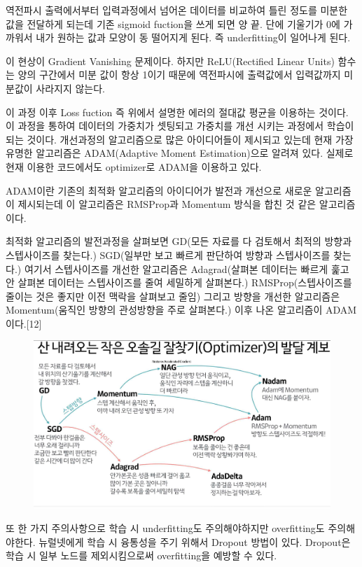 \documentclass[chapter,oneside]{oblivoir}
\begin{document}
역전파시 출력에서부터 입력과정에서 넘어온 데이터를 비교하여 틀린 정도를 미분한 값을 전달하게 되는데 기존 sigmoid fuction을 쓰게 되면 양 끝. 단에 기울기가 0에 가까워서 내가 원하는 값과 모양이 동 떨어지게 된다. 즉 underfitting이 일어나게 된다.

이 현상이 Gradient Vanishing 문제이다. 하지만 ReLU(Rectified Linear Units) 함수는 양의 구간에서 미분 값이 항상 1이기 때문에 역전파시에 출력값에서 입력값까지 미분값이 사라지지 않는다.

이 과정 이후 Loss fuction 즉 위에서 설명한 에러의 절대값 평균을 이용하는 것이다. 이 과정을 통하여 데이터의 가중치가 셋팅되고 가중치를 개선 시키는 과정에서 학습이 되는 것이다. 개선과정의 알고리즘으로 많은 아이디어들이 제시되고 있는데 현재 가장 유명한 알고리즘은 ADAM(Adaptive Moment Estimation)으로 알려져 있다. 실제로 현재 이용한 코드에서도 optimizer로 ADAM을 이용하고 있다.

ADAM이란 기존의 최적화 알고리즘의 아이디어가 발전과 개선으로 새로운 알고리즘이 제시되는데 이 알고리즘은 RMSProp과 Momentum 방식을 합친 것 같은 알고리즘이다.

최적화 알고리즘의 발전과정을 살펴보면 GD(모든 자료를 다 검토해서 최적의 방향과 스텝사이즈를 찾는다.) SGD(일부만 보고 빠르게 판단하여 방향과 스텝사이즈를 찾는다.) 여기서 스텝사이즈를 개선한 알고리즘은 Adagrad(살펴본 데이터는 빠르게 훑고 안 살펴본 데이터는 스텝사이즈를 줄여 세밀하게 살펴본다.) RMSProp(스텝사이즈를 줄이는 것은 좋지만 이전 맥락을 살펴보고 줄임) 그리고 방향을 개선한 알고리즘은 Momentum(움직인 방향의 관성방향을 주로 살펴본다.) 이후 나온 알고리즘이 ADAM이다.[12]

\begin{figure}[h!]
\centering
\includegraphics{pic/chp4/img825}
\end{figure}

또 한 가지 주의사항으로 학습 시 underfitting도 주의해야하지만 overfitting도 주의해야한다. 뉴럴넷에게 학습 시 융통성을 주기 위해서 Dropout 방법이 있다. Dropout은 학습 시 일부 노드를 제외시킴으로써 overfitting을 예방할 수 있다.
\end{document}
